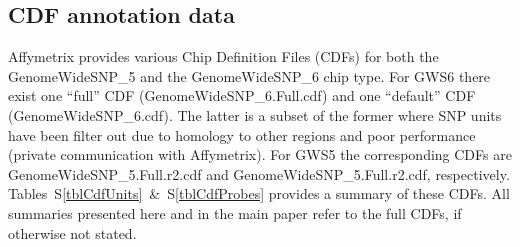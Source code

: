 \documentclass[11pt,a4paper]{article}
\newcommand{\GWSFive}{GWS5\xspace}
\newcommand{\GWSSix}{GWS6\xspace}
\newcommand{\GWSFivef}{GenomeWideSNP\_5\xspace}
\newcommand{\GWSSixf}{GenomeWideSNP\_6\xspace}
\begin{document}
\subsection*{CDF annotation data}

Affymetrix provides various Chip Definition Files (CDFs) for both the \GWSFivef and the \GWSSixf chip type.
For \GWSSix there exist one ``full'' CDF (GenomeWideSNP\_6.Full.cdf) and one ``default'' CDF (GenomeWideSNP\_6.cdf).  The latter is a subset of the former where SNP units have been filter out due to homology to other regions and poor performance (private communication with Affymetrix).
For \GWSFive the corresponding CDFs are GenomeWideSNP\_5.Full.r2.cdf and GenomeWideSNP\_5.Full.r2.cdf, respectively.
Tables~S\ref{tblCdfUnits}~\&~S\ref{tblCdfProbes} provides a summary of these CDFs.
All summaries presented here and in the main paper refer to the full CDFs, if otherwise not stated.
\end{document}

